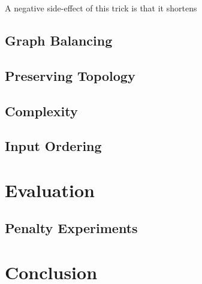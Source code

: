 \documentclass{sig-alternate-sigmod09}
\begin{document}
A negative side-effect of this trick is that it shortens

\subsection{Graph Balancing}
\label{SEC:balancing}

\subsection{Preserving Topology}

\subsection{Complexity}

\subsection{Input Ordering}



\section{Evaluation}

\subsection{Penalty Experiments}

\section{Conclusion}

\balancecolumns
\end{document}
